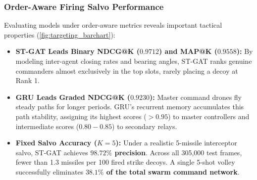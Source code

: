 \documentclass[9pt]{ieeeconf}
\begin{document}
\subsubsection{Order-Aware Firing Salvo Performance}
Evaluating models under order-aware metrics reveals important tactical properties (\cref{fig:targeting_barchart}):
\begin{itemize}
    \item \textbf{ST-GAT Leads Binary NDCG@K ($0.9712$) and MAP@K ($0.9558$):} By modeling inter-agent closing rates and bearing angles, ST-GAT ranks genuine commanders almost exclusively in the top slots, rarely placing a decoy at Rank 1.
    \item \textbf{GRU Leads Graded NDCG@K ($0.9230$):} Master command drones fly steady paths for longer periods. GRU's recurrent memory accumulates this path stability, assigning its highest scores ($>0.95$) to master controllers and intermediate scores ($0.80 - 0.85$) to secondary relays.
    \item \textbf{Fixed Salvo Accuracy ($K=5$):} Under a realistic 5-missile interceptor salvo, ST-GAT achieves \textbf{$98.72\%$ precision}. Across all 305,000 test frames, fewer than 1.3 missiles per 100 fired strike decoys. A single 5-shot volley successfully eliminates \textbf{$38.1\%$ of the total swarm command network}.
\end{itemize}
\end{document}
